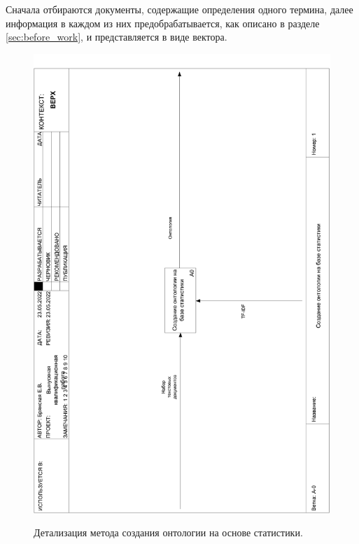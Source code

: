 \newpage

Сначала отбираются документы, содержащие определения одного термина, далее информация в каждом из них предобрабатывается, как описано в разделе \ref{sec:before_work}, и представляется в виде вектора.
\begin{figure}[h]
	\begin{center}
		{\includegraphics[scale = 0.39, angle=-90, page=2]{img/idef0/pdf/ontology.pdf}}
		\caption{Детализация метода создания онтологии на основе статистики.}
		\label{fig24:image}
	\end{center}
\end{figure}

\newpage

